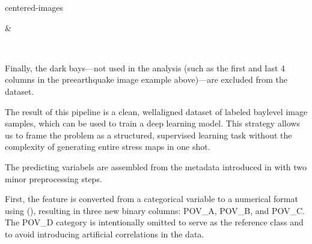 \documentclass[letterpaper,10pt,english]{sphinxmanual}
\begin{document}
\begin{sphinxuseclass}{centered-images}

\begin{savenotes}\sphinxattablestart
\sphinxthistablewithglobalstyle
\centering
\begin{tabular}[t]{}
\sphinxtoprule
\sphinxtableatstartofbodyhook

\begin{sphinxfigure-in-table}
\centering
\capstart
\noindent{}
\label{\detokenize{data:id16}}\end{sphinxfigure-in-table}\relax
&

\begin{sphinxfigure-in-table}
\centering
\capstart
\noindent{}
\label{\detokenize{data:id17}}\end{sphinxfigure-in-table}\relax
\\
\sphinxbottomrule
\end{tabular}
\sphinxtableafterendhook\par
\sphinxattableend\end{savenotes}

\end{sphinxuseclass}
\sphinxAtStartPar
Finally, the dark bays—not used in the analysis (such as the first and last 4
columns in the pre\sphinxhyphen{}earthquake image example above)—are excluded from the dataset.

\sphinxAtStartPar
\textendash{}

\sphinxAtStartPar
The result of this pipeline is a clean, well\sphinxhyphen{}aligned dataset of labeled
bay\sphinxhyphen{}level image samples, which can be used to train a deep learning model.
This strategy allows us to frame the problem as a structured, supervised
learning task without the complexity of generating entire stress maps in one
shot.

\sphinxAtStartPar
The predicting variabels are assembled from the metadata introduced in
{\hyperref[\detokenize{data:metadata}]{}} with two minor preprocessing steps.

\sphinxAtStartPar
First, the  feature is converted from a categorical variable to a
numerical format using  (), resulting in three new
binary columns: POV\_A, POV\_B, and POV\_C.
The POV\_D category is intentionally omitted to serve as the reference class
and to avoid introducing artificial correlations in the data.
\end{document}
